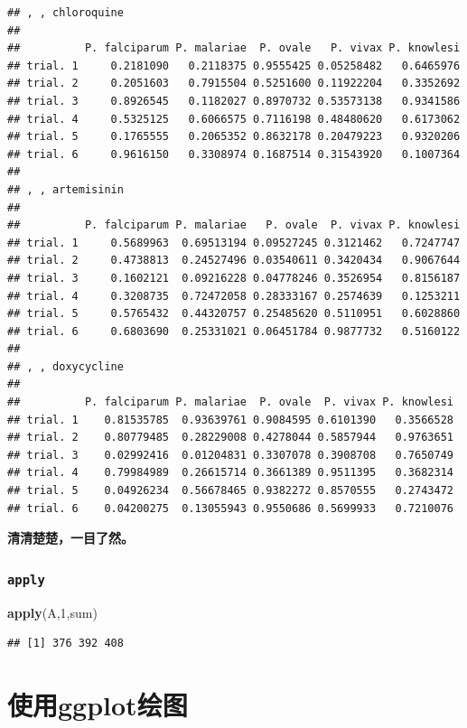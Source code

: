 \documentclass[]{book}
\newenvironment{Shaded}{\begin{snugshade}}{\end{snugshade}}
\newcommand{\DecValTok}[1]{\textcolor[rgb]{0.00,0.00,0.81}{#1}}
\newcommand{\KeywordTok}[1]{\textcolor[rgb]{0.13,0.29,0.53}{\textbf{#1}}}
\newcommand{\NormalTok}[1]{#1}
\begin{document}
\begin{verbatim}
## , , chloroquine
## 
##          P. falciparum P. malariae  P. ovale   P. vivax P. knowlesi
## trial. 1     0.2181090   0.2118375 0.9555425 0.05258482   0.6465976
## trial. 2     0.2051603   0.7915504 0.5251600 0.11922204   0.3352692
## trial. 3     0.8926545   0.1182027 0.8970732 0.53573138   0.9341586
## trial. 4     0.5325125   0.6066575 0.7116198 0.48480620   0.6173062
## trial. 5     0.1765555   0.2065352 0.8632178 0.20479223   0.9320206
## trial. 6     0.9616150   0.3308974 0.1687514 0.31543920   0.1007364
## 
## , , artemisinin
## 
##          P. falciparum P. malariae   P. ovale  P. vivax P. knowlesi
## trial. 1     0.5689963  0.69513194 0.09527245 0.3121462   0.7247747
## trial. 2     0.4738813  0.24527496 0.03540611 0.3420434   0.9067644
## trial. 3     0.1602121  0.09216228 0.04778246 0.3526954   0.8156187
## trial. 4     0.3208735  0.72472058 0.28333167 0.2574639   0.1253211
## trial. 5     0.5765432  0.44320757 0.25485620 0.5110951   0.6028860
## trial. 6     0.6803690  0.25331021 0.06451784 0.9877732   0.5160122
## 
## , , doxycycline
## 
##          P. falciparum P. malariae  P. ovale  P. vivax P. knowlesi
## trial. 1    0.81535785  0.93639761 0.9084595 0.6101390   0.3566528
## trial. 2    0.80779485  0.28229008 0.4278044 0.5857944   0.9763651
## trial. 3    0.02992416  0.01204831 0.3307078 0.3908708   0.7650749
## trial. 4    0.79984989  0.26615714 0.3661389 0.9511395   0.3682314
## trial. 5    0.04926234  0.56678465 0.9382272 0.8570555   0.2743472
## trial. 6    0.04200275  0.13055943 0.9550686 0.5699933   0.7210076
\end{verbatim}

\textbf{清清楚楚，一目了然。}

\hypertarget{apply}{%
\subsection{\texorpdfstring{\texttt{apply}}{apply}}\label{apply}}

\begin{Shaded}
\begin{Highlighting}[]
\KeywordTok{apply}\NormalTok{(A,}\DecValTok{1}\NormalTok{,sum)}
\end{Highlighting}
\end{Shaded}

\begin{verbatim}
## [1] 376 392 408
\end{verbatim}

\hypertarget{graphics}{%
\chapter{使用ggplot绘图}\label{graphics}}
\end{document}
